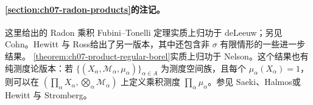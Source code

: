\documentclass[../../main.tex]{subfiles}
\begin{document}
\paragraph*{\cref{section:ch07-radon-products}的注记。}
这里给出的 Radon 乘积 Fubini--Tonelli 定理实质上归功于 deLeeuw\cite{folland-bib-031}；另见 Cohn\cite[\S7.6]{folland-bib-027}。Hewitt 与 Ross\cite[\S13]{folland-bib-075}给出了另一版本，其中还包含非 $\sigma$ 有限情形的一些进一步结果。
\cref{theorem:ch07-product-regular-borel}实质上归功于 Nelson\cite{folland-bib-103}。这个结果也有纯测度论版本：若 $\{(X_\alpha,\mathscr M_\alpha,\mu_\alpha)\}_{\alpha\in A}$ 为测度空间族，且每个 $\mu_\alpha(X_\alpha)=1$，则可以在 $(\prod_\alpha X_\alpha,\bigotimes_\alpha\mathscr M_\alpha)$ 上定义乘积测度 $\prod_\alpha\mu_\alpha$。参见 Saeki\cite{folland-bib-127}、Halmos\cite[\S38]{folland-bib-061}或 Hewitt 与 Stromberg\cite[\S22]{folland-bib-076}。
\end{document}

